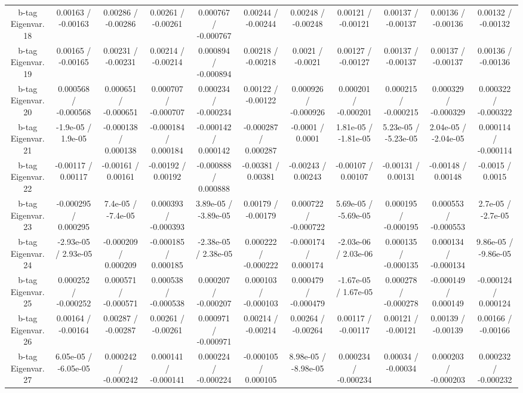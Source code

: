 \begin{table}[htbp]
\begin{center}
\begin{tabular}{|c|c|c|c|c|c|c|c|c|c|c|}
  b-tag Eigenvar. 18 & 0.00163 / -0.00163 & 0.00286 / -0.00286 & 0.00261 / -0.00261 & 0.000767 / -0.000767 & 0.00244 / -0.00244 & 0.00248 / -0.00248 & 0.00121 / -0.00121 & 0.00137 / -0.00137 & 0.00136 / -0.00136 & 0.00132 / -0.00132 \\ 
  b-tag Eigenvar. 19 & 0.00165 / -0.00165 & 0.00231 / -0.00231 & 0.00214 / -0.00214 & 0.000894 / -0.000894 & 0.00218 / -0.00218 & 0.0021 / -0.0021 & 0.00127 / -0.00127 & 0.00137 / -0.00137 & 0.00137 / -0.00137 & 0.00136 / -0.00136 \\ 
  b-tag Eigenvar. 20 & 0.000568 / -0.000568 & 0.000651 / -0.000651 & 0.000707 / -0.000707 & 0.000234 / -0.000234 & 0.00122 / -0.00122 & 0.000926 / -0.000926 & 0.000201 / -0.000201 & 0.000215 / -0.000215 & 0.000329 / -0.000329 & 0.000322 / -0.000322 \\ 
  b-tag Eigenvar. 21 & -1.9e-05 / 1.9e-05 & -0.000138 / 0.000138 & -0.000184 / 0.000184 & -0.000142 / 0.000142 & -0.000287 / 0.000287 & -0.0001 / 0.0001 & 1.81e-05 / -1.81e-05 & 5.23e-05 / -5.23e-05 & 2.04e-05 / -2.04e-05 & 0.000114 / -0.000114 \\ 
  b-tag Eigenvar. 22 & -0.00117 / 0.00117 & -0.00161 / 0.00161 & -0.00192 / 0.00192 & -0.000888 / 0.000888 & -0.00381 / 0.00381 & -0.00243 / 0.00243 & -0.00107 / 0.00107 & -0.00131 / 0.00131 & -0.00148 / 0.00148 & -0.0015 / 0.0015 \\ 
  b-tag Eigenvar. 23 & -0.000295 / 0.000295 & 7.4e-05 / -7.4e-05 & 0.000393 / -0.000393 & 3.89e-05 / -3.89e-05 & 0.00179 / -0.00179 & 0.000722 / -0.000722 & 5.69e-05 / -5.69e-05 & 0.000195 / -0.000195 & 0.000553 / -0.000553 & 2.7e-05 / -2.7e-05 \\ 
  b-tag Eigenvar. 24 & -2.93e-05 / 2.93e-05 & -0.000209 / 0.000209 & -0.000185 / 0.000185 & -2.38e-05 / 2.38e-05 & 0.000222 / -0.000222 & -0.000174 / 0.000174 & -2.03e-06 / 2.03e-06 & 0.000135 / -0.000135 & 0.000134 / -0.000134 & 9.86e-05 / -9.86e-05 \\ 
  b-tag Eigenvar. 25 & 0.000252 / -0.000252 & 0.000571 / -0.000571 & 0.000538 / -0.000538 & 0.000207 / -0.000207 & 0.000103 / -0.000103 & 0.000479 / -0.000479 & -1.67e-05 / 1.67e-05 & 0.000278 / -0.000278 & -0.000149 / 0.000149 & -0.000124 / 0.000124 \\ 
  b-tag Eigenvar. 26 & 0.00164 / -0.00164 & 0.00287 / -0.00287 & 0.00261 / -0.00261 & 0.000971 / -0.000971 & 0.00214 / -0.00214 & 0.00264 / -0.00264 & 0.00117 / -0.00117 & 0.00121 / -0.00121 & 0.00139 / -0.00139 & 0.00166 / -0.00166 \\ 
  b-tag Eigenvar. 27 & 6.05e-05 / -6.05e-05 & 0.000242 / -0.000242 & 0.000141 / -0.000141 & 0.000224 / -0.000224 & -0.000105 / 0.000105 & 8.98e-05 / -8.98e-05 & 0.000234 / -0.000234 & 0.00034 / -0.00034 & 0.000203 / -0.000203 & 0.000232 / -0.000232 \\ 

\end{tabular}
\end{center}
\end{table}
